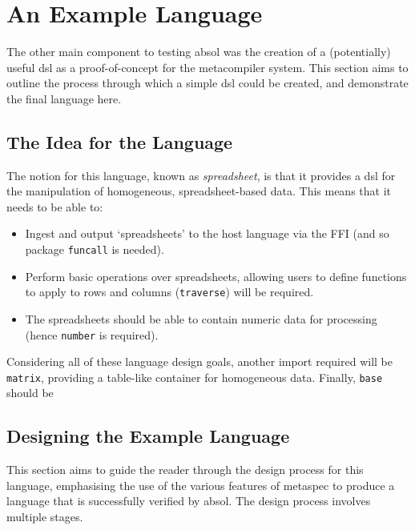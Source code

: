 


\section{An Example Language} %
\label{sec:an_example_language}
The other main component to testing \gls{absol} was the creation of a (potentially) useful \gls{dsl} as a proof-of-concept for the metacompiler system. 
This section aims to outline the process through which a simple \gls{dsl} could be created, and demonstrate the final language here. 

\subsection{The Idea for the Language} %
\label{sub:the_idea_for_the_language}
The notion for this language, known as \textit{spreadsheet}, is that it provides a \gls{dsl} for the manipulation of homogeneous, spreadsheet-based data. 
This means that it needs to be able to:
\begin{itemize}
    \item Ingest and output `spreadsheets' to the host language via the FFI (and so package \texttt{funcall} is needed).
    \item Perform basic operations over spreadsheets, allowing users to define functions to apply to rows and columns (\texttt{traverse}) will be required. 
    \item The spreadsheets should be able to contain numeric data for processing (hence \texttt{number} is required). 
\end{itemize}

Considering all of these language design goals, another import required will be \texttt{matrix}, providing a table-like container for homogeneous data. 
Finally, \texttt{base} should be 


\subsection{Designing the Example Language} %
\label{sub:designing_the_example_language}
This section aims to guide the reader through the design process for this language, emphasising the use of the various features of \gls{metaspec} to produce a language that is successfully verified by \gls{absol}. 
The design process involves multiple stages. 

